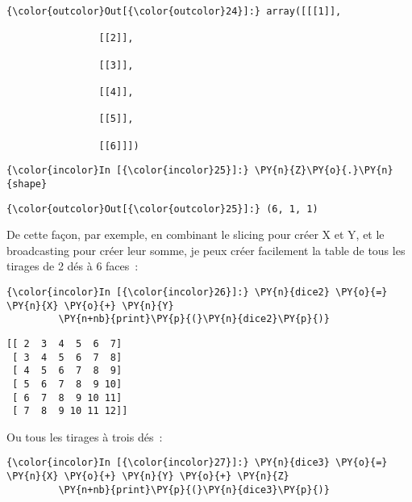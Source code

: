 \begin{Verbatim}[commandchars=\\\{\},frame=single,framerule=0.3mm,rulecolor=\color{cellframecolor}]
{\color{outcolor}Out[{\color{outcolor}24}]:} array([[[1]],
         
                [[2]],
         
                [[3]],
         
                [[4]],
         
                [[5]],
         
                [[6]]])
\end{Verbatim}
            
    \begin{Verbatim}[commandchars=\\\{\},frame=single,framerule=0.3mm,rulecolor=\color{cellframecolor}]
{\color{incolor}In [{\color{incolor}25}]:} \PY{n}{Z}\PY{o}{.}\PY{n}{shape}
\end{Verbatim}


\begin{Verbatim}[commandchars=\\\{\},frame=single,framerule=0.3mm,rulecolor=\color{cellframecolor}]
{\color{outcolor}Out[{\color{outcolor}25}]:} (6, 1, 1)
\end{Verbatim}
            
    De cette façon, par exemple, en combinant le slicing pour créer X et Y,
et le broadcasting pour créer leur somme, je peux créer facilement la
table de tous les tirages de 2 dés à 6 faces~:

    \begin{Verbatim}[commandchars=\\\{\},frame=single,framerule=0.3mm,rulecolor=\color{cellframecolor}]
{\color{incolor}In [{\color{incolor}26}]:} \PY{n}{dice2} \PY{o}{=} \PY{n}{X} \PY{o}{+} \PY{n}{Y}
         \PY{n+nb}{print}\PY{p}{(}\PY{n}{dice2}\PY{p}{)}
\end{Verbatim}


    \begin{Verbatim}[commandchars=\\\{\},frame=single,framerule=0.3mm,rulecolor=\color{cellframecolor}]
[[ 2  3  4  5  6  7]
 [ 3  4  5  6  7  8]
 [ 4  5  6  7  8  9]
 [ 5  6  7  8  9 10]
 [ 6  7  8  9 10 11]
 [ 7  8  9 10 11 12]]
\end{Verbatim}

    Ou tous les tirages à trois dés~:

    \begin{Verbatim}[commandchars=\\\{\},frame=single,framerule=0.3mm,rulecolor=\color{cellframecolor}]
{\color{incolor}In [{\color{incolor}27}]:} \PY{n}{dice3} \PY{o}{=} \PY{n}{X} \PY{o}{+} \PY{n}{Y} \PY{o}{+} \PY{n}{Z}
         \PY{n+nb}{print}\PY{p}{(}\PY{n}{dice3}\PY{p}{)}
\end{Verbatim}


